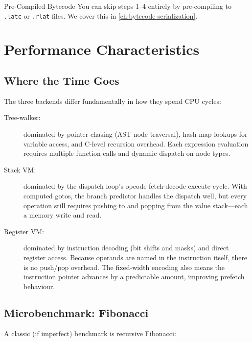 \begin{tipbox}{Pre-Compiled Bytecode}
You can skip steps 1--4 entirely by pre-compiling to \lstinline|.latc| or
\lstinline|.rlat| files. We cover this in \cref{ch:bytecode-serialization}.
\end{tipbox}

\section{Performance Characteristics}\label{sec:backend-performance}

\subsection{Where the Time Goes}

The three backends differ fundamentally in how they spend CPU cycles:

\begin{description}
  \item[Tree-walker:] dominated by pointer chasing (AST node traversal),
    hash-map lookups for variable access, and C-level recursion overhead. Each
    expression evaluation requires multiple function calls and dynamic dispatch
    on node types.

  \item[Stack VM:] dominated by the dispatch loop's opcode fetch-decode-execute
    cycle. With computed gotos, the branch predictor handles the dispatch well,
    but every operation still requires pushing to and popping from the value
    stack---each a memory write and read.

  \item[Register VM:] dominated by instruction decoding (bit shifts and masks)
    and direct register access. Because operands are named in the instruction
    itself, there is no push/pop overhead. The fixed-width encoding also means
    the instruction pointer advances by a predictable amount, improving
    prefetch behaviour.
\end{description}

\subsection{Microbenchmark: Fibonacci}

A classic (if imperfect) benchmark is recursive Fibonacci:

